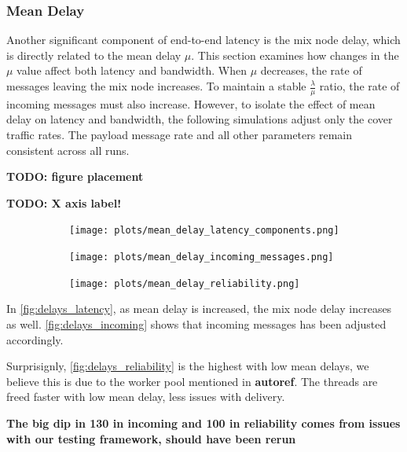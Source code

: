 \documentclass[a4paper,11pt,oneside]{report}
\begin{document}
\subsubsection{Mean Delay}
Another significant component of end-to-end latency is the mix node delay, which is directly related to the mean delay \(\mu\). This section examines how changes in the \(\mu\) value affect both latency and bandwidth. When \(\mu\) decreases, the rate of messages leaving the mix node increases. To maintain a stable \(\frac{\lambda}{\mu}\) ratio, the rate of incoming messages must also increase. However, to isolate the effect of mean delay on latency and bandwidth, the following simulations adjust only the cover traffic rates. The payload message rate and all other parameters remain consistent across all runs.

\textbf{TODO: figure placement}

\textbf{TODO: X axis label!}

\begin{figure}[htbp]
    \centering
    \begin{subfigure}{\textwidth}
        \centering
        \texttt{[image: plots/mean\_delay\_latency\_components.png]}
        \caption{}
        \label{fig:delays_latency}
    \end{subfigure}
    \hfill
    \centering
    \begin{subfigure}{\textwidth}
        \centering
        \texttt{[image: plots/mean\_delay\_incoming\_messages.png]}
        \caption{}
        \label{fig:delays_incoming}
    \end{subfigure}
    \hfill
    \begin{subfigure}{\textwidth}
        \centering
        \texttt{[image: plots/mean\_delay\_reliability.png]}
        \caption{}
        \label{fig:delays_reliability}
    \end{subfigure}
    \hfill
\end{figure}

In \autoref{fig:delays_latency}, as mean delay is increased, the mix node delay increases as well. \autoref{fig:delays_incoming} shows that incoming messages has been adjusted accordingly.

Surprisignly, \autoref{fig:delays_reliability} is the highest with low mean delays, we believe this is due to the worker pool mentioned in \textbf{autoref}. The threads are freed faster with low mean delay, less issues with delivery.

\textbf{The big dip in 130 in incoming and 100 in reliability comes from issues with our testing framework, should have been rerun}
\end{document}
